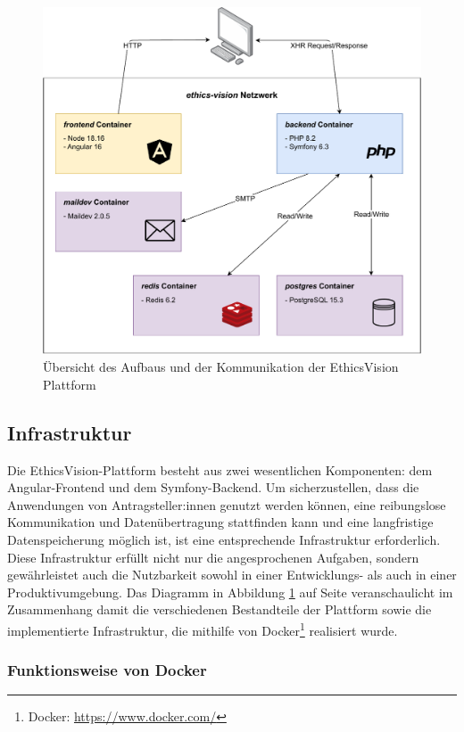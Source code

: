 \documentclass[a4paper,12pt,twoside,numbers=noendperiod]{scrreprt}
\begin{document}
\begin{figure}[ht]
    \centering
    \includegraphics[width=.84\linewidth]{thesis/images/Luidold_EthicsVision-Diagramm.pdf}
    \caption{Übersicht des Aufbaus und der Kommunikation der EthicsVision Plattform}
    \label{fig:ethics-vision-diagramm}
\end{figure}

\subsection{Infrastruktur}
\label{sub-sec:ausarbeitung-infrastruktur}

Die EthicsVision-Plattform besteht aus zwei wesentlichen Komponenten: dem Angular-Frontend und dem Symfony-Backend. Um sicherzustellen, dass die Anwendungen von Antragsteller:innen genutzt werden können, eine reibungslose Kommunikation und Datenübertragung stattfinden kann und eine langfristige Datenspeicherung möglich ist, ist eine entsprechende Infrastruktur erforderlich. Diese Infrastruktur erfüllt nicht nur die angesprochenen Aufgaben, sondern gewährleistet auch die Nutzbarkeit sowohl in einer Entwicklungs- als auch in einer Produktivumgebung. Das Diagramm in Abbildung \ref{fig:ethics-vision-diagramm} auf Seite \pageref{fig:ethics-vision-diagramm} veranschaulicht im Zusammenhang damit die verschiedenen Bestandteile der Plattform sowie die implementierte Infrastruktur, die mithilfe von Docker\footnote{Docker: \url{https://www.docker.com/}} realisiert wurde.

\subsubsection*{Funktionsweise von Docker}
\label{funktionsweise-docker}
\end{document}
